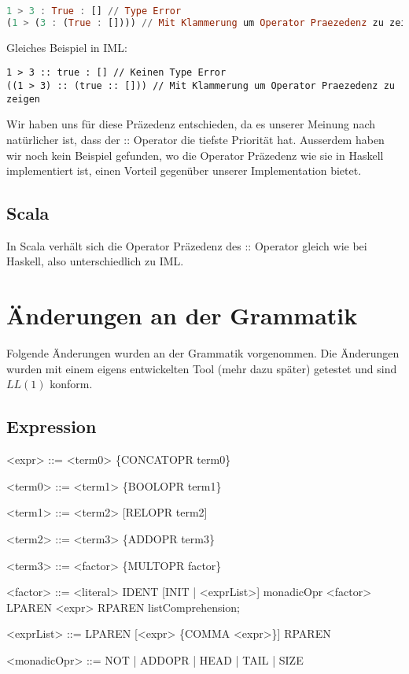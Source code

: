 \documentclass[a4paper,notitlepage,oneside]{article}
\begin{document}
\begin{lstlisting}[language=haskell, caption=Ungültige Cons Operation in Haskell]
1 > 3 : True : [] // Type Error
(1 > (3 : (True : []))) // Mit Klammerung um Operator Praezedenz zu zeigen
\end{lstlisting}

\raggedright
Gleiches Beispiel in IML:

\begin{lstlisting}[language=iml, caption=Gültige Listen Konkatenation in IML]
1 > 3 :: true : [] // Keinen Type Error
((1 > 3) :: (true :: [])) // Mit Klammerung um Operator Praezedenz zu zeigen
\end{lstlisting}
Wir haben uns für diese Präzedenz entschieden, da es unserer Meinung nach natürlicher ist, dass der :: Operator die tiefste Priorität hat.
Ausserdem haben wir noch kein Beispiel gefunden, wo die Operator Präzedenz wie sie in Haskell implementiert ist, einen Vorteil gegenüber unserer Implementation bietet.

\subsection{Scala}
In Scala verhält sich die Operator Präzedenz des :: Operator gleich wie bei Haskell, also unterschiedlich zu IML.


\newpage
\section{Änderungen an der Grammatik}
Folgende Änderungen wurden an der Grammatik vorgenommen. Die Änderungen wurden mit einem eigens entwickelten Tool (mehr dazu später) getestet und sind $LL(1)$ konform.
\subsection{Expression}
\begin{grammar}
<expr> ::= <term0> \{CONCATOPR term0\}

<term0> ::= <term1> \{BOOLOPR term1\}

<term1> ::= <term2> [RELOPR term2]

<term2> ::= <term3> \{ADDOPR term3\}

<term3> ::= <factor> \{MULTOPR factor\}

<factor> ::= <literal>
		\alt IDENT [INIT | <exprList>]
		\alt monadicOpr <factor>
		\alt LPAREN <expr> RPAREN
		\alt listComprehension;
		
<exprList> ::= LPAREN [<expr> \{COMMA <expr>\}] RPAREN

<monadicOpr> ::= NOT | ADDOPR | HEAD | TAIL | SIZE

\end{grammar}
\end{document}
